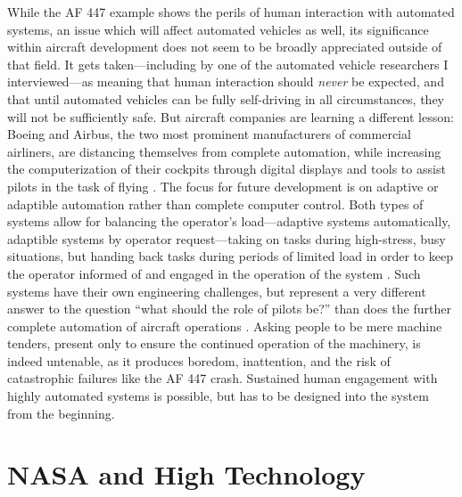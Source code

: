 While the AF 447 example shows the
perils of human interaction with automated systems, an issue which will
affect automated vehicles as well, its significance
within aircraft development does not seem to be broadly appreciated
outside of that field. It gets taken---including by one of the
automated vehicle researchers I interviewed---as meaning that human
interaction should \emph{never} be expected, and that until automated
vehicles can be fully self-driving in all circumstances, they will not
be sufficiently safe. But aircraft companies are learning a
different lesson: Boeing and Airbus, the two
most prominent manufacturers of commercial airliners, are distancing
themselves from complete automation, while increasing the computerization of
their cockpits through digital displays and tools to assist pilots in
the task of flying \cite{787dream} \cite{brownFuture}. The focus for
future development is on adaptive or adaptible automation
rather than complete computer control. Both types of systems allow for
balancing the operator's load---adaptive systems automatically,
adaptible systems by operator request---taking on tasks during
high-stress, busy situations, but handing back tasks during periods of
limited load in order to keep the operator informed of and engaged in
the operation of the system \cite{dahai}. Such systems have their own
engineering challenges, but represent a very different answer to the
question ``what should the role of pilots be?'' than does the further
complete automation of aircraft operations \cite{kaber}. Asking people to be mere machine
tenders, present only to ensure the continued operation of the
machinery, is indeed untenable, as it produces boredom,
inattention, and the risk of catastrophic failures like the AF 447
crash. Sustained human engagement
with highly automated systems is possible, but has to be designed into
the system from the beginning.%


\section{NASA and High Technology}

